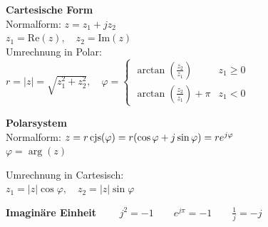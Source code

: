 \begin{minipage}[t]{9.4cm}
  \textbf{Cartesische Form}\\
  Normalform: $z = z_1 +j z_2$\\
  $z_1 = \text{Re}(z), \quad z_2 = \text{Im}(z)$\\
  Umrechnung in Polar:\\
  $r = |z| = \sqrt{z_1^2 + z_2^2}, \quad 
  \varphi =   \begin{cases} 
                  \arctan(\frac{z_2}{z_1}) &z_1 \geq 0\\
                  \arctan(\frac{z_2}{z_1}) + \pi &z_1 < 0
          \end{cases}$
\end{minipage}
\begin{minipage}[t]{9.4cm}
  \textbf{Polarsystem}\\
  Normalform: 
  $z = r \operatorname{cjs}(\varphi) = r(\cos{\varphi} + j\sin{\varphi}) = r e^{j \varphi}$\\
  $\varphi = \arg(z)$

  Umrechnung in Cartesisch:\\
  $z_1 = |z| \cos{\varphi}, \quad z_2 = |z| \sin{\varphi}$
\end{minipage}
\begin{center}
{\textbf{Imaginäre Einheit} $\qquad j^2 = -1 \qquad e^{j\pi} = -1 \qquad
\frac{1}{j} = -j$}
\end{center}

